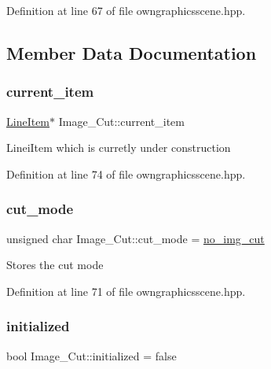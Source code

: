 Definition at line 67 of file owngraphicsscene.\+hpp.



\subsection{Member Data Documentation}
\mbox{\label{structImage__Cut_aa3fcac1ab311c38947b343d8913fb2e8}} 
\subsubsection{\texorpdfstring{current\+\_\+item}{current\_item}}
{\footnotesize\ttfamily \mbox{\hyperlink{classLineItem}{Line\+Item}}$\ast$ Image\+\_\+\+Cut\+::current\+\_\+item}

Linei\+Item which is curretly under construction 

Definition at line 74 of file owngraphicsscene.\+hpp.

\mbox{\label{structImage__Cut_ad4904a8753086961301a91050f6b2794}} 
\subsubsection{\texorpdfstring{cut\+\_\+mode}{cut\_mode}}
{\footnotesize\ttfamily unsigned char Image\+\_\+\+Cut\+::cut\+\_\+mode = \mbox{\hyperlink{owngraphicsscene_8hpp_a749db80b860523fda0b90a1c2afa5067}{no\+\_\+img\+\_\+cut}}}

Stores the cut mode 

Definition at line 71 of file owngraphicsscene.\+hpp.

\mbox{\label{structImage__Cut_a7259136300a6eade3ee84743f3e47c1f}} 
\subsubsection{\texorpdfstring{initialized}{initialized}}
{\footnotesize\ttfamily bool Image\+\_\+\+Cut\+::initialized = false}

